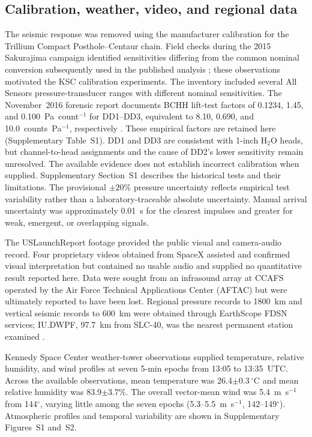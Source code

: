 \documentclass[]{seismica}
\begin{document}
\subsection{Calibration, weather, video, and regional data}

The seismic response was removed using the manufacturer calibration for the
Trillium Compact Posthole--Centaur chain. Field checks during the 2015
Sakurajima campaign identified sensitivities differing from the common
nominal conversion subsequently used in the published analysis
\citep{smith_sakurajima_2020}; these observations motivated the KSC calibration
experiments. The inventory included several All Sensors pressure-transducer
ranges with different nominal sensitivities. The November~2016 forensic
report documents BCHH lift-test factors of 0.1234, 1.45, and
0.100~Pa~count$^{-1}$ for DD1--DD3, equivalent to 8.10, 0.690, and
10.0~counts~Pa$^{-1}$, respectively \citep{thompson_mcnutt_fireball_2016}.
These empirical factors are retained here (Supplementary Table~S1).
DD1 and DD3 are consistent with 1-inch H$_2$O heads, but channel-to-head
assignments and the cause of DD2's lower sensitivity remain unresolved.
The available evidence does not establish incorrect calibration when supplied.
Supplementary Section~S1 describes the historical tests and their limitations.
The provisional $\pm20\%$ pressure uncertainty reflects empirical test
variability rather than a laboratory-traceable absolute uncertainty. Manual
arrival uncertainty was approximately 0.01~s for the clearest impulses and
greater for weak, emergent, or overlapping signals.

The USLaunchReport footage provided the public visual and camera-audio record.
Four proprietary videos obtained from SpaceX assisted and confirmed visual
interpretation but contained no usable audio and supplied no quantitative
result reported here. Data were sought from an infrasound array at CCAFS
operated by the Air Force Technical Applications Center (AFTAC)
but were ultimately reported to have been lost. Regional pressure records to 1800~km
and vertical seismic records to 600~km were obtained through EarthScope FDSN
services; IU.DWPF, 97.7~km from SLC-40, was the nearest permanent station
examined \citep{asl_gsn_iu_1988}.

Kennedy Space Center weather-tower observations supplied temperature,
relative humidity, and wind profiles at seven 5-min epochs from 13:05 to
13:35~UTC. Across the available observations, mean temperature was
26.4$\pm0.3\,^{\circ}$C and mean relative humidity was
83.9$\pm3.7\%$. The overall vector-mean wind was 5.4~m~s$^{-1}$ from
144$^\circ$, varying little among the seven epochs (5.3--5.5~m~s$^{-1}$,
142--149$^\circ$).
Atmospheric profiles and temporal variability are shown in Supplementary
Figures~S1 and~S2.
\end{document}

